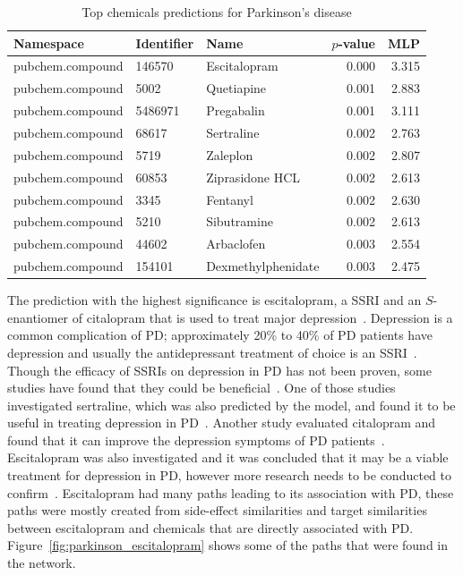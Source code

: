 \begin{table}[h]
    \centering
    \begin{tabular}{|l|l|l|r|r|}
        \hline
        \textbf{Namespace} & \textbf{Identifier} & \textbf{Name} & \textbf{$p$-value} & \textbf{MLP} \\
        \hline
        pubchem.compound & 146570 & Escitalopram & 0.000 & 3.315 \\
        \hline
        pubchem.compound & 5002 & Quetiapine & 0.001 & 2.883 \\
        \hline
        pubchem.compound & 5486971 & Pregabalin & 0.001 & 3.111 \\
        \hline
        pubchem.compound & 68617 & Sertraline & 0.002 & 2.763 \\
        \hline
        pubchem.compound & 5719 & Zaleplon & 0.002 & 2.807 \\
        \hline
        pubchem.compound & 60853 & Ziprasidone HCL & 0.002 & 2.613 \\
        \hline
        pubchem.compound & 3345 & Fentanyl & 0.002 & 2.630 \\
        \hline
        pubchem.compound & 5210 & Sibutramine & 0.002 & 2.613 \\
        \hline
        pubchem.compound & 44602 & Arbaclofen & 0.003 & 2.554 \\
        \hline
        pubchem.compound & 154101 & Dexmethylphenidate & 0.003 & 2.475 \\
        \hline
    \end{tabular}
    \caption{Top chemicals predictions for Parkinson's disease}
    \label{tab:phenotype_drug}
\end{table}

The prediction with the highest significance is escitalopram, a \ac{SSRI} and an $S$-enantiomer of citalopram that is used to treat major depression~\cite{weintraub_escitalopram_2006}.
Depression is a common complication of \ac{PD}; approximately 20\% to 40\% of \ac{PD} patients have depression and usually the antidepressant treatment of choice is an \ac{SSRI}~\cite{weintraub_escitalopram_2006}.
Though the efficacy of \ac{SSRI}s on depression in \ac{PD} has not been proven, some studies have found that they could be beneficial~\cite{rampello_ssri_2002, hauser_sertraline_1997, ceravolo_paroxetine_2000, menza_citalopram_2004}.
One of those studies investigated sertraline, which was also predicted by the model, and found it to be useful in treating depression in \ac{PD}~\cite{hauser_sertraline_1997}.
Another study evaluated citalopram and found that it can improve the depression symptoms of \ac{PD} patients~\cite{menza_citalopram_2004}.
Escitalopram was also investigated and it was concluded that it may be a viable treatment for depression in \ac{PD}, however more research needs to be conducted to confirm~\cite{weintraub_escitalopram_2006, verma_efficacy_2012}.
Escitalopram had many paths leading to its association with \ac{PD}, these paths were mostly created from side-effect similarities and target similarities between escitalopram and chemicals that are directly associated with \ac{PD}.
Figure~\ref{fig:parkinson_escitalopram} shows some of the paths that were found in the network.

